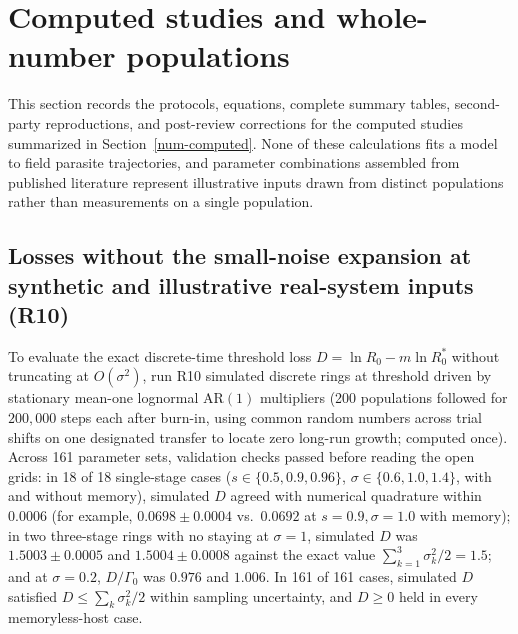 \section{Computed studies and whole-number populations}\label{num-esm-computed}

This section records the protocols, equations, complete summary tables, second-party reproductions, and post-review corrections for the computed studies summarized in Section~\ref{num-computed}. None of these calculations fits a model to field parasite trajectories, and parameter combinations assembled from published literature represent illustrative inputs drawn from distinct populations rather than measurements on a single population.

\subsection{Losses without the small-noise expansion at synthetic and illustrative real-system inputs (R10)}\label{num-esm-r10}

To evaluate the exact discrete-time threshold loss $D = \ln R_0 - m\ln R_0^*$ without truncating at $O(\sigma^2)$, run R10 simulated discrete rings at threshold driven by stationary mean-one lognormal $\mathrm{AR}(1)$ multipliers (200 populations followed for $200{,}000$ steps each after burn-in, using common random numbers across trial shifts on one designated transfer to locate zero long-run growth; computed once). Across 161 parameter sets, validation checks passed before reading the open grids: in 18 of 18 single-stage cases ($s \in \{0.5, 0.9, 0.96\}$, $\sigma \in \{0.6, 1.0, 1.4\}$, with and without memory), simulated $D$ agreed with numerical quadrature within $0.0006$ (for example, $0.0698 \pm 0.0004$ vs.\ $0.0692$ at $s = 0.9, \sigma = 1.0$ with memory); in two three-stage rings with no staying at $\sigma = 1$, simulated $D$ was $1.5003 \pm 0.0005$ and $1.5004 \pm 0.0008$ against the exact value $\sum_{k=1}^3 \sigma_k^2/2 = 1.5$; and at $\sigma = 0.2$, $D/\Gamma_0$ was $0.976$ and $1.006$. In 161 of 161 cases, simulated $D$ satisfied $D \le \sum_k \sigma_k^2/2$ within sampling uncertainty, and $D \ge 0$ held in every memoryless-host case.


